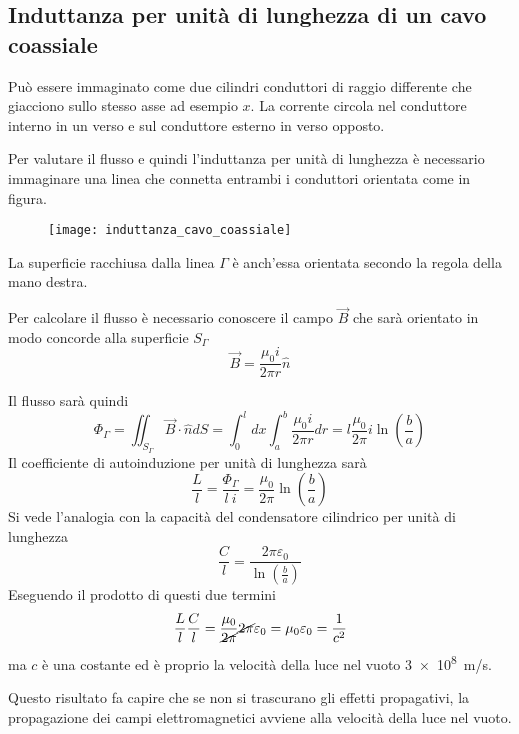 \subsection{Induttanza per unità di lunghezza di un cavo coassiale}
Può essere immaginato come due cilindri conduttori di raggio differente che giacciono
sullo stesso asse ad esempio $x$. La corrente circola nel conduttore interno in un verso
e sul conduttore esterno in verso opposto.

Per valutare il flusso e quindi l'induttanza per unità di lunghezza è necessario immaginare
una linea che connetta entrambi i conduttori orientata come in figura.
\begin{figure}[H]
\centering
\texttt{[image: induttanza\_cavo\_coassiale]}
\end{figure}
La superficie racchiusa dalla linea $\Gamma$ è anch'essa orientata secondo la regola della 
mano destra.

Per calcolare il flusso è necessario conoscere il campo $\vec{B}$ che sarà orientato in modo concorde alla superficie $S_\Gamma$
$$
\vec{B} = \frac{\mu_0 i }{2\pi r}\hat{n}
$$

Il flusso sarà quindi
$$
\Phi_\Gamma = \iint_{S_\Gamma} \vec{B}\cdot\hat{n}dS = \int_0^l dx\int_a^b \frac{\mu_0 i}{2 \pi r} dr = l \frac{\mu_0}{2\pi} i \ln\left(\frac{b}{a}\right)
$$
Il coefficiente di autoinduzione per unità di lunghezza sarà
$$
\frac{L}{l} = \frac{\Phi_\Gamma}{l\ i } = \frac{\mu_0}{2\pi} \ln\left(\frac{b}{a}\right)
$$
Si vede l'analogia con la capacità del condensatore cilindrico per unità di lunghezza
$$
\frac{C}{l} = \frac{2\pi\varepsilon_0}{\ln\left(\frac{b}{a}\right)}
$$
Eseguendo il prodotto di questi due termini
$$
\frac{L}{l}\frac{C}{l} = \frac{\mu_0}{\cancel{2\pi}}\cancel{2\pi}\varepsilon_0 = \mu_0 
\varepsilon_0 = \frac{1}{c^2}
$$
ma $c$ è una costante ed è proprio la velocità della luce nel vuoto \SI{3e8}{\meter/\second}.

Questo risultato fa  capire che se non si trascurano gli effetti propagativi, la 
propagazione dei campi elettromagnetici avviene alla velocità della luce nel vuoto.
